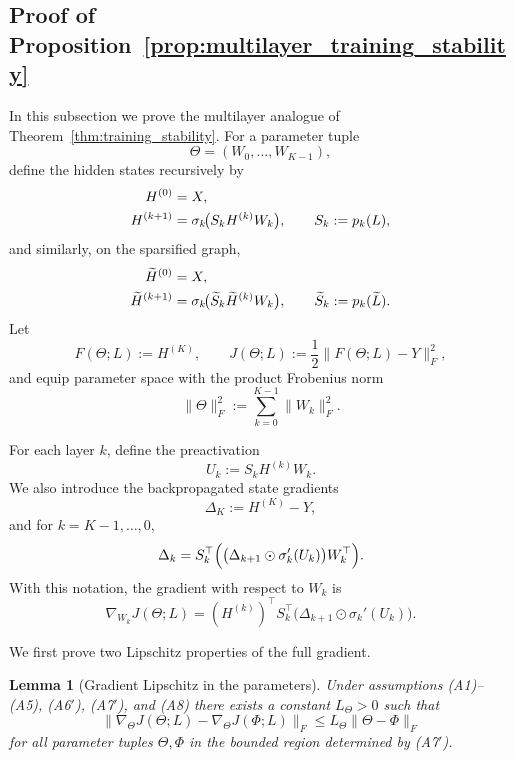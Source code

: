 \documentclass{article}
\newtheorem{lemma}{Lemma}
\begin{document}
\subsection{Proof of Proposition~\ref{prop:multilayer_training_stability}}
\label{app:multilayer_training_stability}

In this subsection we prove the multilayer analogue of Theorem~\ref{thm:training_stability}. For a parameter tuple
\[
\Theta=(W_0,\dots,W_{K-1}),
\]
define the hidden states recursively by
\begin{align}
H^{(0)}&=X, \notag\\
H^{(k+1)}&=\sigma_k\!\bigl(S_k H^{(k)}W_k\bigr),
\qquad
S_k:=p_k(L),
\label{eq:app_multilayer_forward_dense}
\end{align}
and similarly, on the sparsified graph,
\begin{align}
\widetilde H^{(0)}&=X, \notag\\
\widetilde H^{(k+1)}
&=
\sigma_k\!\bigl(\widetilde S_k \widetilde H^{(k)}W_k\bigr),
\qquad
\widetilde S_k:=p_k(\widetilde L).
\label{eq:app_multilayer_forward_sparse}
\end{align}
Let
\[
F(\Theta;L):=H^{(K)},
\qquad
J(\Theta;L):=\frac12 \|F(\Theta;L)-Y\|_F^2,
\]
and equip parameter space with the product Frobenius norm
\[
\|\Theta\|_F^2:=\sum_{k=0}^{K-1}\|W_k\|_F^2.
\]

For each layer $k$, define the preactivation
\[
U_k:=S_k H^{(k)}W_k.
\]
We also introduce the backpropagated state gradients
\[
\Delta_K := H^{(K)}-Y,
\]
and for $k=K-1,\dots,0$,
\begin{equation}
\Delta_k
=
S_k^\top
\Bigl(
\bigl(\Delta_{k+1}\odot \sigma_k'(U_k)\bigr)W_k^\top
\Bigr).
\label{eq:app_delta_recursion}
\end{equation}
With this notation, the gradient with respect to $W_k$ is
\begin{equation}
\nabla_{W_k}J(\Theta;L)
=
(H^{(k)})^\top S_k^\top
\bigl(\Delta_{k+1}\odot \sigma_k'(U_k)\bigr).
\label{eq:app_multilayer_weight_gradient}
\end{equation}

We first prove two Lipschitz properties of the full gradient.

\begin{lemma}[Gradient Lipschitz in the parameters]
\label{lem:multilayer_grad_lipschitz_theta}
Under assumptions (A1)--(A5), (A6$'$), (A7$'$), and (A8) there exists a constant $L_\Theta>0$ such that
\[
\|\nabla_\Theta J(\Theta;L)-\nabla_\Theta J(\Phi;L)\|_F
\le
L_\Theta \|\Theta-\Phi\|_F
\]
for all parameter tuples $\Theta,\Phi$ in the bounded region determined by (A7$'$).
\end{lemma}
\end{document}

